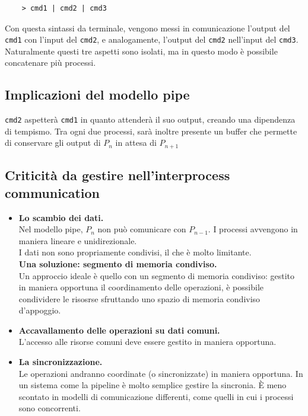 \documentclass{report}
\begin{document}
\begin{verbatim}
    > cmd1 | cmd2 | cmd3
\end{verbatim}

Con questa sintassi da terminale, vengono messi in comunicazione l'output del \verb|cmd1| con l'input del \verb|cmd2|, e analogamente, l'output del \verb|cmd2| nell'input del \verb|cmd3|.
Naturalmente questi tre aspetti sono isolati, ma in questo modo è possibile concatenare più processi.

\subsection{Implicazioni del modello pipe}
\verb|cmd2| aspetterà \verb|cmd1| in quanto attenderà il suo output, creando una dipendenza di tempismo. Tra ogni due processi, sarà inoltre presente un buffer che permette di conservare gli output di $P_n$ in attesa di $P_{n+1}$

\newpage

\subsection{Criticità da gestire nell'interprocess communication}
\begin{itemize}
    \item \textbf{Lo scambio dei dati.}\\
    Nel modello pipe, $P_n$ non può comunicare con $P_{n-1}$. I processi avvengono in maniera lineare e unidirezionale. \\
    I dati non sono propriamente condivisi, il che è molto limitante.\\
    \textbf{Una soluzione: segmento di memoria condiviso.}\\
    Un approccio ideale è quello con un segmento di memoria condiviso: gestito in maniera opportuna il coordinamento delle operazioni, è possibile condividere le risosrse sfruttando uno spazio di memoria condiviso d'appoggio.
    \item \textbf{Accavallamento delle operazioni su dati comuni.}\\
    L'accesso alle risorse comuni deve essere gestito in maniera opportuna.

    \item \textbf{La sincronizzazione.}\\
    Le operazioni andranno coordinate (o sincronizzate) in maniera opportuna. In un sistema come la pipeline è molto semplice gestire la sincronia. È meno scontato in modelli di comunicazione differenti, come quelli in cui i processi sono concorrenti.
\end{itemize}
\end{document}
